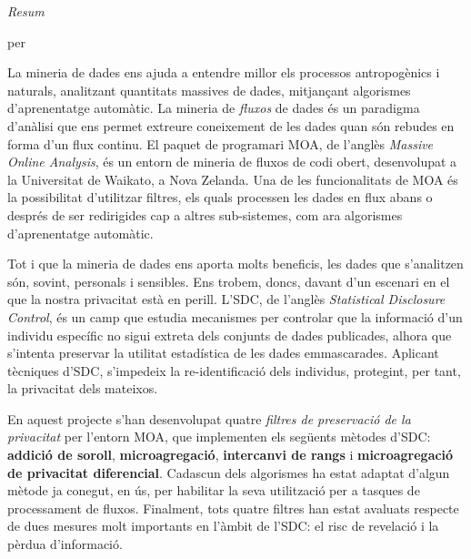 \thispagestyle{plain}
\null\vfil
\begin{center}
	\setlength{\parskip}{0pt}
	{\huge{\textit{Resum}} \par}
	\bigskip
	{\Large\bf \ttitle \par} %
	\medskip
	{\normalsize per \authornames \par} %
\end{center}

La mineria de dades ens ajuda a entendre millor els processos antropogènics i naturals, analitzant quantitats massives de dades, mitjançant algorismes d'aprenentatge automàtic. La mineria de \textit{fluxos} de dades és un paradigma d'anàlisi que ens permet extreure coneixement de les dades quan són rebudes en forma d'un flux continu. El paquet de programari MOA, de l'anglès \textit{Massive Online Analysis}, és un entorn de mineria de fluxos de codi obert, desenvolupat a la Universitat de Waikato, a Nova Zelanda. Una de les funcionalitats de MOA és la possibilitat d'utilitzar filtres, els quals processen les dades en flux abans o després de ser redirigides cap a altres sub-sistemes, com ara algorismes d'aprenentatge automàtic.

Tot i que la mineria de dades ens aporta molts beneficis, les dades que s'analitzen són, sovint, personals i sensibles. Ens trobem, doncs, davant d'un escenari en el que la nostra privacitat està en perill. L'SDC, de l'anglès \textit{Statistical Disclosure Control}, és un camp que estudia mecanismes per controlar que la informació d'un individu específic no sigui extreta dels conjunts de dades publicades, alhora que s'intenta preservar la utilitat estadística de les dades emmascarades. Aplicant tècniques d'SDC, s'impedeix la re-identificació dels individus, protegint, per tant, la privacitat dels mateixos.

En aquest projecte s'han desenvolupat quatre \textit{filtres de preservació de la privacitat} per l'entorn MOA, que implementen els següents mètodes d'SDC: \textbf{addició de soroll}, \textbf{microagregació}, \textbf{intercanvi de rangs} i \textbf{microagregació de privacitat diferencial}. Cadascun dels algorismes ha estat adaptat d'algun mètode ja conegut, en ús, per habilitar la seva utilització per a tasques de processament de fluxos. Finalment, tots quatre filtres han estat avaluats respecte de dues mesures molt importants en l'àmbit de l'SDC: el risc de revelació i la pèrdua d'informació.

